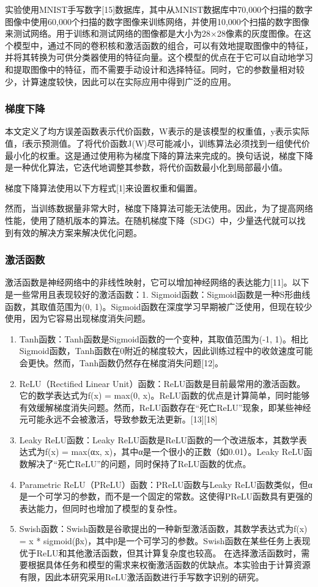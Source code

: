 \documentclass[11pt]{article}
\begin{document}
实验使用MNIST手写数字[15]数据库，其中从MNIST数据库中70,000个扫描的数字图像中使用60,000个扫描的数字图像来训练网络，并使用10,000个扫描的数字图像来测试网络。用于训练和测试网络的图像都是大小为28×28像素的灰度图像。在这个模型中，通过不同的卷积核和激活函数的组合，可以有效地提取图像中的特征，并将其转换为可供分类器使用的特征向量。这个模型的优点在于它可以自动地学习和提取图像中的特征，而不需要手动设计和选择特征。同时，它的参数量相对较少，计算速度较快，因此可以在实际应用中得到广泛的应用。
\subsubsection{梯度下降}
\label{sec:org0097728}
本文定义了均方误差函数表示代价函数，W表示的是该模型的权重值，y表示实际值，f表示预测值。了将代价函数J(W)尽可能减小，训练算法必须找到一组使代价最小化的权重。这是通过使用称为梯度下降的算法来完成的。换句话说，梯度下降是一种优化算法，它迭代地调整其参数，将代价函数最小化到局部最小值。

梯度下降算法使用以下方程式[1]来设置权重和偏置。

然而，当训练数据量非常大时，梯度下降算法可能无法使用。因此，为了提高网络性能，使用了随机版本的算法。在随机梯度下降（SDG）中，少量迭代就可以找到有效的解决方案来解决优化问题。
\subsubsection{激活函数}
\label{sec:org053ef05}
激活函数是神经网络中的非线性映射，它可以增加神经网络的表达能力[11]。以下是一些常用且表现较好的激活函数：1. Sigmoid函数：Sigmoid函数是一种S形曲线函数，其取值范围为(0, 1)。Sigmoid函数在深度学习早期被广泛使用，但现在较少使用，因为它容易出现梯度消失问题。
\begin{enumerate}
\item Tanh函数：Tanh函数是Sigmoid函数的一个变种，其取值范围为(-1, 1)。相比Sigmoid函数，Tanh函数在0附近的梯度较大，因此训练过程中的收敛速度可能会更快。然而，Tanh函数仍然存在梯度消失问题[12]。
\item ReLU（Rectified Linear Unit）函数：ReLU函数是目前最常用的激活函数。它的数学表达式为f(x) = max(0, x)。ReLU函数的优点是计算简单，同时能够有效缓解梯度消失问题。然而，ReLU函数存在“死亡ReLU”现象，即某些神经元可能永远不会被激活，导致参数无法更新。[13][18]
\item Leaky ReLU函数：Leaky ReLU函数是ReLU函数的一个改进版本，其数学表达式为f(x) = max(αx, x)，其中α是一个很小的正数（如0.01）。Leaky ReLU函数解决了“死亡ReLU”的问题，同时保持了ReLU函数的优点。
\item Parametric ReLU（PReLU）函数：PReLU函数与Leaky ReLU函数类似，但α是一个可学习的参数，而不是一个固定的常数。这使得PReLU函数具有更强的表达能力，但同时也增加了模型的复杂性。
\item Swish函数：Swish函数是谷歌提出的一种新型激活函数，其数学表达式为f(x) = x * sigmoid(βx)，其中β是一个可学习的参数。Swish函数在某些任务上表现优于ReLU和其他激活函数，但其计算复杂度也较高。
在选择激活函数时，需要根据具体任务和模型的需求来权衡激活函数的优缺点。本实验由于计算资源有限，因此本研究采用ReLU激活函数进行手写数字识别的研究。
\end{enumerate}
\end{document}
